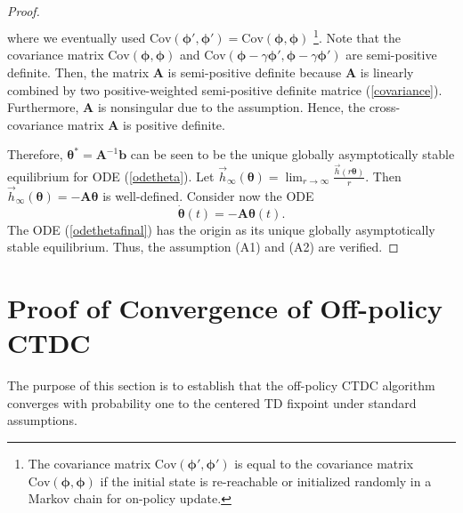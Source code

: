 \begin{proof}
\begin{equation}
\begin{array}{ccl}
    \end{array}
    \label{covariance}
    \end{equation}
    where we eventually used $\mathrm{Cov}(\bm{\bm{\phi}}',\bm{\bm{\phi}}')=\mathrm{Cov}(\bm{\bm{\phi}},\bm{\bm{\phi}})$
    \footnote{The covariance matrix $\mathrm{Cov}(\bm{\bm{\phi}}',\bm{\bm{\phi}}')$ is equal to
    the covariance matrix $\mathrm{Cov}(\bm{\bm{\phi}},\bm{\bm{\phi}})$ if the initial state is re-reachable or
    initialized randomly in a Markov chain for on-policy update.}.
    Note that the covariance matrix $\mathrm{Cov}(\bm{\bm{\phi}},\bm{\bm{\phi}})$ and
    $\mathrm{Cov}(\bm{\bm{\phi}}-\gamma\bm{\bm{\phi}}',\bm{\bm{\phi}}-\gamma\bm{\bm{\phi}}')$ are semi-positive
    definite. Then, the matrix $\textbf{A}$ is semi-positive definite because  $\textbf{A}$ is
    linearly combined  by  two positive-weighted semi-positive definite matrice
    (\ref{covariance}).
    Furthermore, $\textbf{A}$ is nonsingular due to the assumption.
    Hence, the cross-covariance matrix $\textbf{A}$ is positive definite.
    
    Therefore,
    $\bm{\bm{\theta}}^*=\textbf{A}^{-1}\bm{b}$ can be seen to be the unique globally asymptotically
    stable equilibrium for ODE (\ref{odetheta}).
    Let $\vec{h}_{\infty}(\bm{\bm{\theta}})=\lim_{r\rightarrow
    \infty}\frac{\vec{h}(r\bm{\bm{\theta}})}{r}$. Then
    $\vec{h}_{\infty}(\bm{\bm{\theta}})=-\textbf{A}\bm{\bm{\theta}}$ is well-defined. 
    Consider now the ODE
    \begin{equation}
    \dot{\bm{\bm{\theta}}}(t)=-\textbf{A}\bm{\bm{\theta}}(t).
    \label{odethetafinal}
    \end{equation}
    The ODE (\ref{odethetafinal}) has the origin as its unique globally asymptotically stable equilibrium.
    Thus, the assumption (A1) and (A2) are verified.
\end{proof}

\section{Proof of Convergence of Off-policy CTDC}
The purpose of this section
is to establish that the  off-policy CTDC algorithm converges with probability one
to the centered TD fixpoint
 under standard assumptions.

